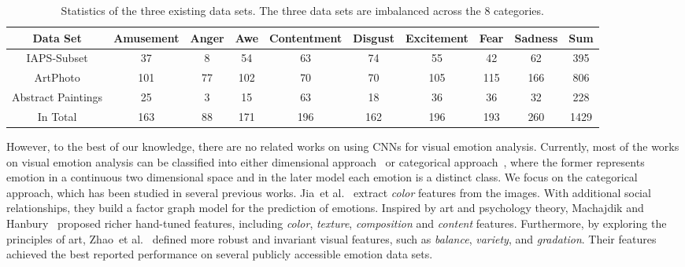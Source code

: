 \documentclass[letterpaper]{article}
\begin{document}

\begin{table}
\small
\begin{center}
\begin{tabular}{*{10}{|c}|}
\hline
Data Set & Amusement & Anger & Awe & Contentment & Disgust & Excitement & Fear & Sadness & Sum \\
\hline\hline
IAPS-Subset & 37& 8& 54& 63 & 74& 55&42&62 & 395 \\
ArtPhoto & 101 &77&102&70&70& 105 & 115 & 166 & 806 \\
Abstract Paintings & 25 & 3 & 15 & 63&  18 & 36 & 36 & 32 & 228 \\
In Total & 163 & 88 & 171 & 196 & 162 & 196 & 193 & 260 & 1429 \\
\hline
\end{tabular}
\end{center}
\caption{Statistics of the three existing data sets. The three data sets are imbalanced across the 8 categories.}
\label{tab:dataset:base}
\end{table}
However, to the best of our knowledge, there are no related works on using CNNs for visual emotion analysis. Currently, most of the works on visual emotion analysis can be classified into either dimensional approach~\cite{nicolaou2011multi,Lu:2012:SCE:2393347.2393384} or categorical approach~\cite{machajdik2010affective,borth2013large,Zhao:2014:EPF:2647868.2654930}, where the former represents emotion in a continuous two dimensional space and in the later model each emotion is a distinct class. We focus on the categorical approach, which has been studied in several previous works. Jia~et al.~ extract \textit{color} features from the images. With additional social relationships, they build a factor graph model for the prediction of emotions. Inspired by art and psychology theory, Machajdik and Hanbury~ proposed richer hand-tuned features, including \textit{color}, \textit{texture}, \textit{composition} and \textit{content} features. Furthermore, by exploring the principles of art, Zhao~et al.~ defined more robust and invariant visual features, such as \textit{balance}, \textit{variety}, and \textit{gradation}. Their features achieved the best reported performance on several publicly accessible emotion data sets.
\end{document}
